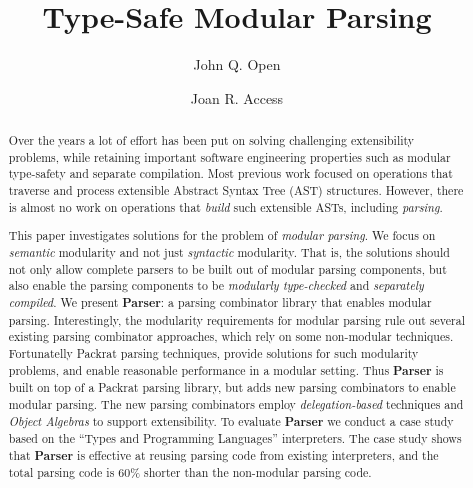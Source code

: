 \documentclass[a4paper,UKenglish]{lipics}
\title{Type-Safe Modular Parsing}
\author[1]{John Q. Open}
\author[2]{Joan R. Access}
\affil[1]{Dummy University Computing Laboratory\\
  Address, Country\\
  \texttt{open@dummyuni.org}}
\affil[2]{Department of Informatics, Dummy College\\
  Address, Country\\
  \texttt{access@dummycollege.org}}
\newcommand\name{\textbf{Parser}\xspace}
\begin{document}
\maketitle

\begin{abstract}

  Over the years a lot of effort has been put on solving challenging
  extensibility problems, while retaining important software
  engineering properties such as modular type-safety and
  separate compilation. Most previous work focused on
  operations that traverse and process extensible Abstract Syntax Tree
  (AST) structures. However, there is almost no work on operations that
  \emph{build} such extensible ASTs, including \emph{parsing}.

  This paper investigates solutions for the problem of \emph{modular
    parsing}. We focus on \emph{semantic} modularity and not just
  \emph{syntactic} modularity. That is, the solutions should not only
  allow complete parsers to be built out of modular parsing
  components, but also enable the parsing components to be
  \emph{modularly type-checked} and \emph{separately compiled}. We
  present \name: a parsing combinator library that enables modular
  parsing. Interestingly, the modularity requirements for modular
  parsing rule out several existing parsing combinator approaches,
  which rely on some non-modular techniques. Fortunatelly Packrat
  parsing techniques, provide solutions for such modularity problems,
  and enable reasonable performance in a modular setting.  Thus \name
  is built on top of a Packrat parsing library, but adds new parsing
  combinators to enable modular parsing. The new parsing combinators
  employ \emph{delegation-based} techniques and \emph{Object Algebras}
  to support extensibility. To evaluate \name we conduct a case study
  based on the ``Types and Programming Languages'' interpreters. The
  case study shows that \name is effective at reusing parsing code
  from existing interpreters, and the total parsing code is 60\%
  shorter than the non-modular parsing code.

\end{abstract}



%
\end{document}
